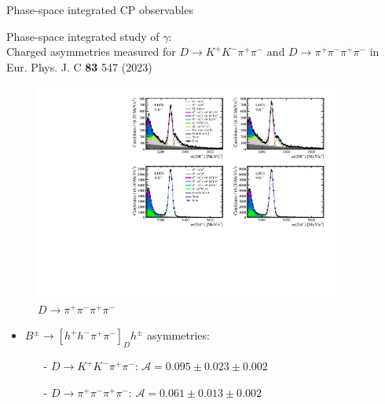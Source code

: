 \documentclass[xcolor={dvipsnames}]{beamer}
\begin{document}
\begin{frame}{Phase-space integrated CP observables}
  \begin{center}
    {\large Phase-space integrated study of $\gamma$: \\
    Charged asymmetries measured for $D\to K^+K^-\pi^+\pi^-$ and $D\to\pi^+\pi^-\pi^+\pi^-$ in Eur. Phys. J. C \textbf{83} 547 (2023)}
  \end{center}
  \vspace{-0.4cm}
  \begin{figure}
    \centering
    \includegraphics[width = 0.9\textwidth,trim={0 7cm 0 0},clip=true]{Plots/d2pipipipi_fiveL_allDP_GLW.pdf}
    \caption*{$D\to\pi^+\pi^-\pi^+\pi^-$}
  \end{figure}
  \vspace{-0.5cm}
  \begin{itemize}
    \item{$B^\pm\to[h^+h^-\pi^+\pi^-]_Dh^\pm$ asymmetries:}
    \begin{itemize}
      \item[-]{$D\to K^+K^-\pi^+\pi^-$: $\mathcal{A} = 0.095 \pm 0.023 \pm 0.002$}
      \item[-]{$D\to\pi^+\pi^-\pi^+\pi^-$: $\mathcal{A} = 0.061 \pm 0.013 \pm 0.002$}
    \end{itemize}
  \end{itemize}
\end{frame}
\end{document}
